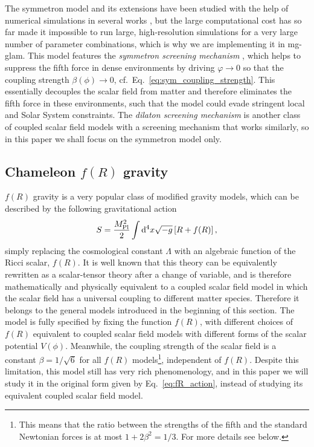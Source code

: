 The symmetron model and its extensions have been studied with the help of numerical simulations in several works \cite{Davis:2011pj,Brax:2012a}, but the large computational cost has so far made it impossible to run large, high-resolution simulations for a very large number of parameter combinations, which is why we are implementing it in {\sc mg}-{\sc glam}. This model features the \textit{symmetron screening mechanism} \cite{Hinterbichler:2010es}, which helps to suppress the fifth force in dense environments by driving $\varphi\rightarrow0$ so that the coupling strength $\beta(\phi)\rightarrow0$, cf.~Eq.~\eqref{eq:sym_coupling_strength}. This essentially decouples the scalar field from matter and therefore eliminates the fifth force in these environments, such that the model could evade stringent local and Solar System constraints. The \textit{dilaton screening mechanism} \cite{Brax:2010gi} is another class of coupled scalar field models with a screening mechanism that works similarly, so in this paper we shall focus on the symmetron model only.

\subsection{Chameleon $f(R)$ gravity}
\label{subsect:fR}

$f(R)$ gravity \cite{Sotiriou:2008rp,DeFelice:2010aj} is a very popular class of modified gravity models, which can be described by the following gravitational action
\begin{equation}\label{eq:fR_action}
    S = \frac{M^2_{\rm Pl}}{2}\int{\rm d}^4x\sqrt{-g}\left[R+f(R)\right],
\end{equation}
simply replacing the cosmological constant $\Lambda$ with an algebraic function of the Ricci scalar, $f(R)$. It is well known that this theory can be equivalently rewritten as a scalar-tensor theory after a change of variable, and is therefore mathematically and physically equivalent to a coupled scalar field model in which the scalar field has a universal coupling to different matter species. Therefore it belongs to the general models introduced in the beginning of this section. The model is fully specified by fixing the function $f(R)$, with different choices of $f(R)$ equivalent to coupled scalar field models with different forms of the scalar potential $V(\phi)$. Meanwhile, the coupling strength of the scalar field is a constant $\beta=1/\sqrt{6}$ for all $f(R)$ models\footnote{This means that the ratio between the strengths of the fifth and the standard Newtonian forces is at most $1+2\beta^2=1/3$. For more details see below.}, independent of $f(R)$. Despite this limitation, this model still has very rich phenomenology, and in this paper we will study it in the original form given by Eq.~\eqref{eq:fR_action}, instead of studying its equivalent coupled scalar field model.


